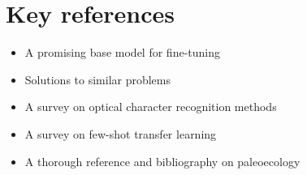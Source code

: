 \documentclass{article}
\begin{document}
\section{Key references}

\begin{itemize}
    \item \cite{li2021trocr} A promising base model for fine-tuning
    \item \cite{10478003} \cite{10.1145/3075645} \cite{10.1145/3542954.3542957} Solutions to similar problems
    \item \cite{9151144} A survey on optical character recognition methods 
    \item \cite{10.1145/3582688} A survey on few-shot transfer learning
    \item \cite{Faith_Lyman_2019} A thorough reference and bibliography on paleoecology
\end{itemize}

\printbibliography
\end{document}
